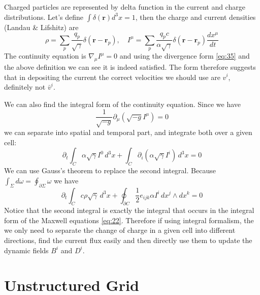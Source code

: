 Charged particles are represented by delta function in the current and charge
distributions. Let's define $\int \delta(\mathbf{r})d^3x = 1$, then the charge
and current densities (Landau \& Lifshitz) are
\begin{equation}
  \label{eq:34}
  \rho = \sum_p\frac{q_p}{\sqrt{\gamma}}\delta(\mathbf{r}-\mathbf{r}_p),\quad I^{\mu} = \sum_p\frac{q_pc}{\alpha\sqrt{\gamma}}\delta(\mathbf{r} - \mathbf{r}_p)\frac{dx^{\mu}}{dt}
\end{equation}
The continuity equation is $\nabla_{\mu}I^{\mu} = 0$ and using the divergence
form \eqref{eq:35} and the above definition we can see it is indeed satisfied.
The form therefore suggests that in depositing the current the correct
velocities we should use are $v^i$, definitely not $\bar{v}^i$.

We can also find the integral form of the continuity equation. Since we have
\begin{equation}
  \label{eq:35}
  \frac{1}{\sqrt{-g}}\partial_{\mu}\left( \sqrt{-g} I^{\mu} \right) = 0
\end{equation}
we can separate into spatial and temporal part, and integrate both over a given
cell:
\begin{equation}
  \label{eq:36}
  \partial_t\int_C \alpha\sqrt{\gamma}I^0\,d^3x + \int_C \partial_i \left( \alpha\sqrt{\gamma}I^i \right)\,d^3x = 0
\end{equation}
We can use Gauss's theorem to replace the second integral. Because $\int_{\Sigma} d\omega
= \oint_{\partial\Sigma}\omega$ we have
\begin{equation}
  \label{eq:37}
  \partial_t\int_Cc\rho\sqrt{\gamma}\,d^3x + \oint_{\partial C}\frac{1}{2}e_{ijk}\alpha I^i\,dx^j\wedge dx^k = 0
\end{equation}
Notice that the second integral is exactly the integral that occurs in the
integral form of the Maxwell equations \eqref{eq:22}. Therefore if using
integral formalism, the we only need to separate the change of charge in a given
cell into different directions, find the current flux easily and then directly
use them to update the dynamic fields $B^i$ and $D^i$.

\section{Unstructured Grid}
\label{sec:unstructured-pic}



